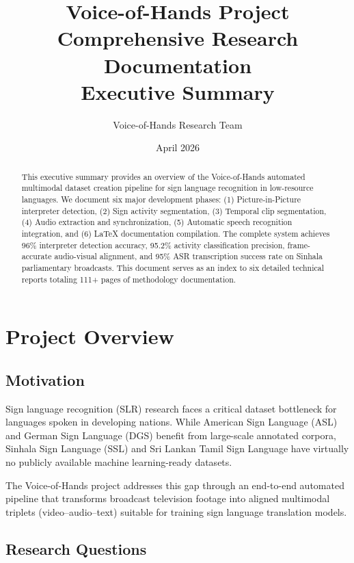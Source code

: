 \documentclass[11pt,a4paper]{article}
\title{\textbf{Voice-of-Hands Project}\\Comprehensive Research Documentation\\Executive Summary}
\author{Voice-of-Hands Research Team}
\date{April 2026}
\begin{document}
\maketitle

\begin{abstract}
This executive summary provides an overview of the Voice-of-Hands automated multimodal dataset creation pipeline for sign language recognition in low-resource languages. We document six major development phases: (1) Picture-in-Picture interpreter detection, (2) Sign activity segmentation, (3) Temporal clip segmentation, (4) Audio extraction and synchronization, (5) Automatic speech recognition integration, and (6) LaTeX documentation compilation. The complete system achieves 96\% interpreter detection accuracy, 95.2\% activity classification precision, frame-accurate audio-visual alignment, and 95\% ASR transcription success rate on Sinhala parliamentary broadcasts. This document serves as an index to six detailed technical reports totaling 111+ pages of methodology documentation.
\end{abstract}

\section{Project Overview}

\subsection{Motivation}

Sign language recognition (SLR) research faces a critical dataset bottleneck for languages spoken in developing nations. While American Sign Language (ASL) and German Sign Language (DGS) benefit from large-scale annotated corpora, Sinhala Sign Language (SSL) and Sri Lankan Tamil Sign Language have virtually no publicly available machine learning-ready datasets.

The Voice-of-Hands project addresses this gap through an end-to-end automated pipeline that transforms broadcast television footage into aligned multimodal triplets (video--audio--text) suitable for training sign language translation models.

\subsection{Research Questions}
\end{document}
